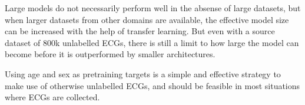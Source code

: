 \documentclass[journal,twoside,web]{ieeecolor}
\begin{document}
Large models do not necessarily perform well in the absense of large datasets, but when larger datasets from other domains are available, the effective model size can be increased with the help of transfer learning. But even with a source dataset of 800k unlabelled ECGs, there is still a limit to how large the model can become before it is outperformed by smaller architectures. 

Using age and sex as pretraining targets is a simple and effective strategy to make use of otherwise unlabelled ECGs, and should be feasible in most situations where ECGs are collected. 




\end{document}
